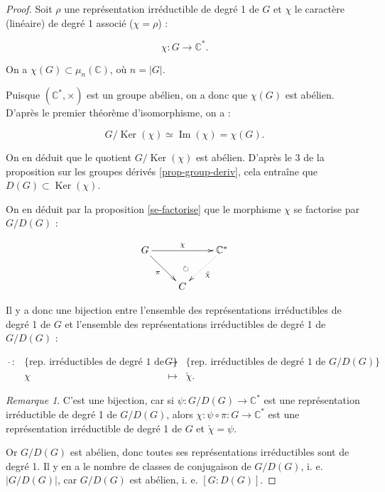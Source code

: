 \documentclass[french]{book}
\theoremstyle{definition}
\theoremstyle{remark}
\newtheorem*{remark}{Remarque}
\begin{document}
\begin{proof}
  Soit \(\rho\) une représentation irréductible de degré 1 de \(G\) et \(\chi\) le caractère (linéaire) de degré 1 associé (\(\chi = \rho\)) :

  \[\chi : G \longrightarrow \mathbb{C} ^{*}.\]

  On a \(\chi(G) \subset \mu_n(\mathbb{C})\), où \(n=\left\lvert G \right\rvert\).

  Puisque \((\mathbb{C}^{*}, \times)\) est un groupe abélien, on a donc que \(\chi(G)\) est abélien. D'après le premier théorème d'isomorphisme, on a :

  \[G/ \operatorname{Ker}(\chi) \simeq \operatorname{Im}(\chi) = \chi(G).\]

  On en déduit que le quotient \(G/\operatorname{Ker}(\chi)\) est abélien. D'après le 3 de la proposition sur les groupes dérivés \ref{prop-group-deriv}, cela entraîne que \(D(G) \subset \operatorname{Ker}(\chi)\).

  On en déduit par la proposition \ref{se-factorise} que le morphisme \(\chi\) se factorise par \(G/D(G)\) :

  \begin{equation*}
    \xymatrix{
    G\ar[rr]^-{\chi}\ar[dr]_-{\pi}&\ar@{}@<0.8ex>[d]|{\circlearrowright}&\mathbb{C}^{*}\ar@{.>}[dl]^-{\check{\chi}}\\
    &C&
    }
  \end{equation*}

  Il y a donc une bijection entre l'ensemble des représentations irréductibles de degré 1 de \(G\) et l'ensemble des représentations irréductibles de degré 1 de \(G/D(G)\) :

  \[\begin{matrix}
  \check{ \ } : & \{ \text{rep. irréductibles de degré 1 de } G \}& \longrightarrow & \{ \text{rep. irréductibles de degré 1 de } G/D(G) \}\\
  \ & \chi & \longmapsto & \check{\chi}.
  \end{matrix}\]

  \begin{remark}
    C'est une bijection, car si \(\psi : G/D(G) \longrightarrow \mathbb{C} ^{*}\) est une représentation irréductible de degré 1 de \(G/D(G)\), alors \(\chi : \psi \circ \pi : G \longrightarrow \mathbb{C}^{*}\) est une représentation irréductible de degré 1 de \(G\) et \(\check{\chi} = \psi\).
  \end{remark}

  Or \(G/D(G)\) est abélien, donc toutes ses représentations irréductibles sont de degré 1. Il y en a le nombre de classes de conjugaison de \(G/D(G)\), i. e. \(\left\lvert G/D(G) \right\rvert\), car \(G/D(G)\) est abélien, i. e. \([G : D(G)]\).
\end{proof}
\end{document}
